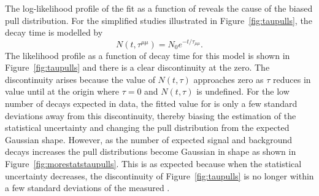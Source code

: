 {%

The log-likelihood profile of the  fit as a function of \tmumu reveals the cause of the biased pull distribution. For the simplified studies illustrated in Figure~\ref{fig:taupulls}, the decay time is modelled by
\begin{equation}
N(t, \tau^{\mu \mu}) = N_{0}e^{-t/\tau_{\mu\mu}}.
\end{equation}
The likelihood profile as a function of decay time for this model is shown in Figure~\ref{fig:taupulls} and there is a clear discontinuity at the zero. The discontinuity arises because the value of $N(t, \tau)$ approaches zero as $\tau$ reduces in value until at the origin where $\tau = 0$ and $N(t, \tau)$ is undefined. %
For the low number of \bsmumu decays expected in data, the fitted value for \tmumu is only a few standard deviations away from this discontinuity, thereby biasing the estimation of the statistical uncertainty and changing the pull distribution from the expected Gaussian shape. However, as the number of expected signal and background decays increases the \tmumu pull distributions become Gaussian in shape as shown in Figure~\ref{fig:morestatstaupulls}. This is as expected because when the statistical uncertainty decreases, the discontinuity of Figure~\ref{fig:taupulls} is no longer within a few standard deviations of the measured \tmumu.

}
